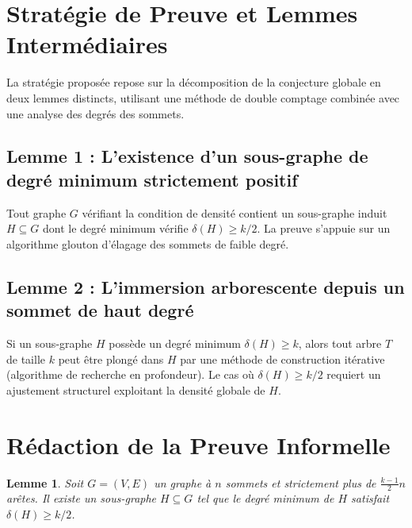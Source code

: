 \documentclass[12pt,a4paper]{article}
\newtheorem{lemma}[theorem]{Lemme}
\begin{document}
\section{Stratégie de Preuve et Lemmes Intermédiaires}

La stratégie proposée repose sur la décomposition de la conjecture globale en deux lemmes distincts, utilisant une méthode de double comptage combinée avec une analyse des degrés des sommets.

\subsection{Lemme 1 : L'existence d'un sous-graphe de degré minimum strictement positif}
Tout graphe $G$ vérifiant la condition de densité contient un sous-graphe induit $H \subseteq G$ dont le degré minimum vérifie $\delta(H) \geq k/2$. La preuve s'appuie sur un algorithme glouton d'élagage des sommets de faible degré.

\subsection{Lemme 2 : L'immersion arborescente depuis un sommet de haut degré}
Si un sous-graphe $H$ possède un degré minimum $\delta(H) \geq k$, alors tout arbre $T$ de taille $k$ peut être plongé dans $H$ par une méthode de construction itérative (algorithme de recherche en profondeur). Le cas où $\delta(H) \geq k/2$ requiert un ajustement structurel exploitant la densité globale de $H$.

\section{Rédaction de la Preuve Informelle}

\begin{lemma}
Soit $G = (V, E)$ un graphe à $n$ sommets et strictement plus de $\frac{k-1}{2}n$ arêtes. Il existe un sous-graphe $H \subseteq G$ tel que le degré minimum de $H$ satisfait $\delta(H) \geq k/2$.
\end{lemma}
\end{document}
